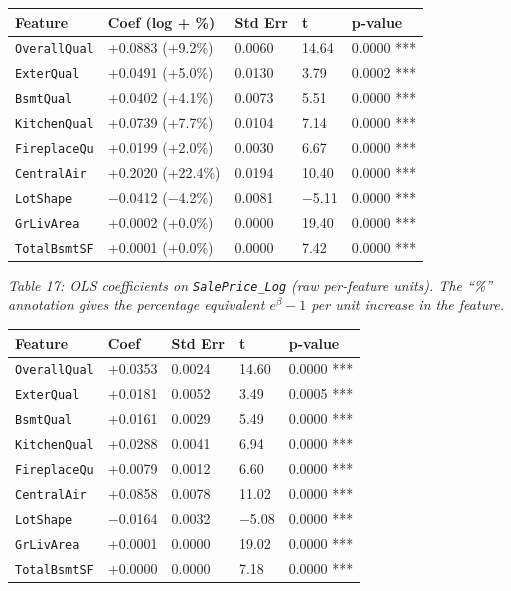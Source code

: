 \begin{longtable}[]{@{}lllll@{}}
\toprule\noalign{}
Feature & Coef (log + \%) & Std Err & t & p-value \\
\midrule\noalign{}
\endhead
\bottomrule\noalign{}
\endlastfoot
\texttt{OverallQual} & +0.0883 (+9.2\%) & 0.0060 & 14.64 & 0.0000 *** \\
\texttt{ExterQual} & +0.0491 (+5.0\%) & 0.0130 & 3.79 & 0.0002 *** \\
\texttt{BsmtQual} & +0.0402 (+4.1\%) & 0.0073 & 5.51 & 0.0000 *** \\
\texttt{KitchenQual} & +0.0739 (+7.7\%) & 0.0104 & 7.14 & 0.0000 *** \\
\texttt{FireplaceQu} & +0.0199 (+2.0\%) & 0.0030 & 6.67 & 0.0000 *** \\
\texttt{CentralAir} & +0.2020 (+22.4\%) & 0.0194 & 10.40 & 0.0000 *** \\
\texttt{LotShape} & −0.0412 (−4.2\%) & 0.0081 & −5.11 & 0.0000 *** \\
\texttt{GrLivArea} & +0.0002 (+0.0\%) & 0.0000 & 19.40 & 0.0000 *** \\
\texttt{TotalBsmtSF} & +0.0001 (+0.0\%) & 0.0000 & 7.42 & 0.0000 *** \\
\end{longtable}

\emph{Table 17: OLS coefficients on \texttt{SalePrice\_Log} (raw
per-feature units). The ``\%'' annotation gives the percentage
equivalent \(e^\beta - 1\) per unit increase in the feature.}

\begin{longtable}[]{@{}lllll@{}}
\toprule\noalign{}
Feature & Coef & Std Err & t & p-value \\
\midrule\noalign{}
\endhead
\bottomrule\noalign{}
\endlastfoot
\texttt{OverallQual} & +0.0353 & 0.0024 & 14.60 & 0.0000 *** \\
\texttt{ExterQual} & +0.0181 & 0.0052 & 3.49 & 0.0005 *** \\
\texttt{BsmtQual} & +0.0161 & 0.0029 & 5.49 & 0.0000 *** \\
\texttt{KitchenQual} & +0.0288 & 0.0041 & 6.94 & 0.0000 *** \\
\texttt{FireplaceQu} & +0.0079 & 0.0012 & 6.60 & 0.0000 *** \\
\texttt{CentralAir} & +0.0858 & 0.0078 & 11.02 & 0.0000 *** \\
\texttt{LotShape} & −0.0164 & 0.0032 & −5.08 & 0.0000 *** \\
\texttt{GrLivArea} & +0.0001 & 0.0000 & 19.02 & 0.0000 *** \\
\texttt{TotalBsmtSF} & +0.0000 & 0.0000 & 7.18 & 0.0000 *** \\
\end{longtable}

